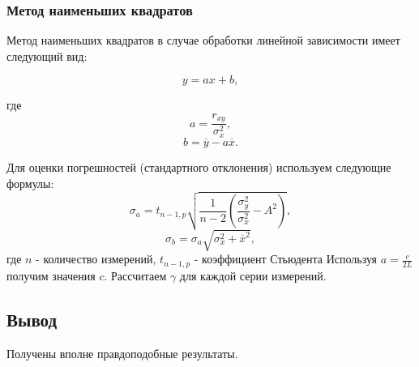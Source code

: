 \documentclass[12pt,a4paper]{article}
\begin{document}
\subsubsection*{Метод наименьших квадратов}
Метод наименьших квадратов в случае обработки линейной зависимости имеет следующий вид:

$$y = ax + b,$$

где $$a = \frac{r_{xy}}{ \sigma_x^2},$$
$$b = \overline{y} - a\overline{x}.$$

Для оценки погрешностей (стандартного отклонения) используем следующие формулы:
$$\sigma_a =  t_{n-1, p} \sqrt{\frac{1}{n-2} \left( \frac{\sigma_y^2}{\sigma_x^2} - A^2 \right)},$$
$$\sigma_b = \sigma_a \sqrt{\sigma_x^2 + \overline{x}^2},$$
где 
$n$ - количество измерений, $ t_{n-1, p}$ - коэффициент Стьюдента
Используя $a = \frac{c}{2L}$ получим значения $c$.
Рассчитаем $\gamma$ для каждой серии измерений.


\subsection*{Вывод}

Получены вполне правдоподобные результаты. 
\end{document}
